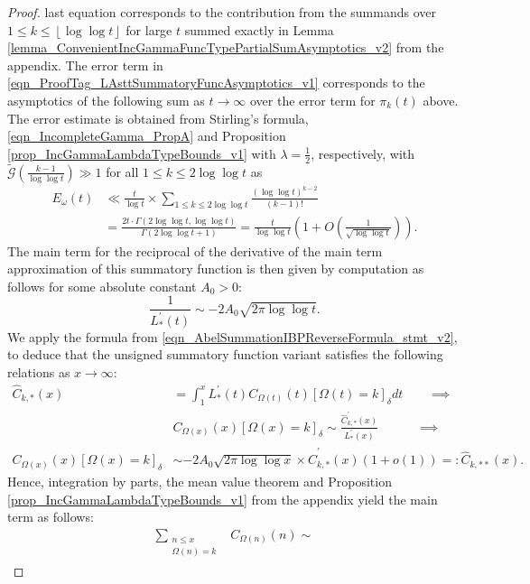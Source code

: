 \documentclass[11pt,reqno,a4letter]{article}
\numberwithin{figure}{section}
\numberwithin{table}{section}
\newcommand{\Iverson}[1]{\ensuremath{\left[#1\right]_{\delta}}}
\newcommand{\floor}[1]{\left\lfloor #1 \right\rfloor}
\theoremstyle{plain}
\numberwithin{theorem}{section}
\theoremstyle{definition}
\begin{document}
\begin{proof}
last equation corresponds to the contribution from the summands over 
$1 \leq k \leq \floor{\log\log t}$ for large $t$ summed exactly in 
Lemma \ref{lemma_ConvenientIncGammaFuncTypePartialSumAsymptotics_v2} from the appendix. 
The error term in \eqref{eqn_ProofTag_LAsttSummatoryFuncAsymptotics_v1} 
corresponds to the asymptotics of the 
following sum as $t \rightarrow \infty$ over the error term for $\pi_k(t)$ above. 
The error estimate is obtained from Stirling's formula, \eqref{eqn_IncompleteGamma_PropA} and 
Proposition \ref{prop_IncGammaLambdaTypeBounds_v1} with $\lambda = \frac{1}{2}$, respectively, with 
$\widetilde{\mathcal{G}}\left(\frac{k-1}{\log\log t}\right) \gg 1$ for all 
$1 \leq k \leq 2\log\log t$ as
\begin{align*} 
E_{\omega}(t) & \ll \frac{t}{\log t} \times \sum_{1 \leq k \leq 2\log\log t} \frac{(\log\log t)^{k-2}}{(k-1)!} \\ 
     & = 
     \frac{2t \cdot \Gamma(2\log\log t, \log\log t)}{\Gamma(2\log\log t + 1)} 
     = \frac{t}{\log\log t} \left(1 + O\left(\frac{1}{\sqrt{\log\log t}}\right)\right). 
\end{align*}
The main term for the reciprocal of the derivative of the main term approximation of this 
summatory function is then given by computation as follows for some absolute constant $A_0 > 0$: 
\[
\frac{1}{L_{\ast}^{\prime}(t)} \sim -2A_0 \sqrt{2\pi \log\log t}. 
\]
We apply the formula from \eqref{eqn_AbelSummationIBPReverseFormula_stmt_v2},  
to deduce that the unsigned summatory function variant satisfies the following 
relations as $x \rightarrow \infty$: 
\begin{align*} 
     \widehat{C}_{k,\ast}(x) & = \int_1^{x} L_{\ast}^{\prime}(t) C_{\Omega(t)}(t) \Iverson{\Omega(t) = k} 
     dt \qquad \implies \\ 
     & 
     C_{\Omega(x)}(x) \Iverson{\Omega(x) = k} 
     \sim \frac{\widehat{C}_{k,\ast}^{\prime}(x)}{L_{\ast}^{\prime}(x)} \qquad\quad \implies \\ 
     C_{\Omega(x)}(x) \Iverson{\Omega(x) = k} & \sim 
     -2A_0 \sqrt{2\pi \log\log x} \times \widehat{C}_{k,\ast}^{\prime}(x) (1+o(1)) 
     =: \widehat{C}_{k,\ast\ast}(x). 
\end{align*} 
Hence, integration by parts, the mean value theorem  
and Proposition \ref{prop_IncGammaLambdaTypeBounds_v1} 
from the appendix yield the main term as follows:  
\begin{align}
\label{eqn_proofTag_CkAstAstHatx_DerivativeFormula_NeedsIBP_v1} 
\sum_{\substack{n \leq x \\ \Omega(n)=k}} & C_{\Omega(n)}(n) \sim

\end{align}
\end{proof}
\end{document}
